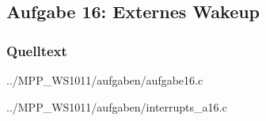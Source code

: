 \subsection*{Aufgabe 16: Externes Wakeup}

\subsubsection*{Quelltext}

{../MPP_WS1011/aufgaben/aufgabe16.c}


{../MPP_WS1011/aufgaben/interrupts_a16.c}
